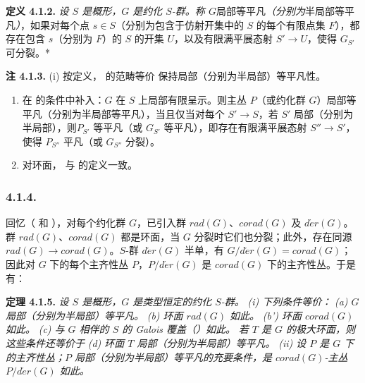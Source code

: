 \textbf{定义 4.1.2.} \emph{设 \(S\) 是概形，\(G\) 是约化 \(S\)-群。称 \(G\)}局部等平凡\emph{（分别为}半局部等平凡\emph{）}，如果对每个点 \(s \in S\)（分别为包含于仿射开集中的 \(S\) 的每个有限点集 \(F\)），都存在包含 \(s\)（分别为 \(F\)）的 \(S\) 的开集 \(U\)，以及有限满平展态射 \(S' \to U\)，使得 \(G_{S'}\) 可分裂。*

\textbf{注 4.1.3.} (i) 按定义， 的范畴等价  保持局部（分别为半局部）等平凡性。
\begin{enumerate}
\def\labelenumi{(\roman{enumi})}
\setcounter{enumi}{1}
\item 在  的条件中补入：\(G\) 在 \(S\) 上局部有限呈示。则主丛 \(P\)（或约化群 \(G\)）局部等平凡（分别为半局部等平凡），当且仅当对每个 \(S' \to S\)，若 \(S'\) 局部（分别为半局部），则\(P_{S'}\) 等平凡（或 \(G_{S'}\) 等平凡），即存在有限满平展态射 \(S'' \to S'\)，使得 \(P_{S''}\) 平凡（或 \(G_{S''}\) 分裂）。
\item 对环面， 与 的定义一致。
\end{enumerate}

\subsubsection*{4.1.4.}
回忆（ 和 ），对每个约化群 \(G\)，已引入群 \(rad(G)\)、\(corad(G)\) 及 \(d\acute{e}r(G)\)。群 \(rad(G)\)、\(corad(G)\) 都是环面，当 \(G\) 分裂时它们也分裂；此外，存在同源 \(rad(G) \to corad(G)\)。\(S\)-群 \(d\acute{e}r(G)\) 半单，有 \(G / d\acute{e}r(G) =corad(G)\)；因此对 \(G\) 下的每个主齐性丛 \(P\)，\(P / d\acute{e}r(G)\) 是 \(corad(G)\) 下的主齐性丛。于是有：

\textbf{定理 4.1.5.} \emph{设 \(S\) 是概形，\(G\) 是类型恒定的约化 \(S\)-群。}
\emph{(i) 下列条件等价：}
\emph{(a) \(G\) 局部（分别为半局部）等平凡。}
\emph{(b) 环面 \(rad(G)\) 如此。}
\emph{(b') 环面 \(corad(G)\) 如此。}
\emph{(c) 与 \(G\) 相伴的 \(S\) 的 Galois 覆盖（）如此。}
\emph{若 \(T\) 是 \(G\) 的极大环面，则这些条件还等价于}
\emph{(d) 环面 \(T\) 局部（分别为半局部）等平凡。}
\emph{(ii) 设 \(P\) 是 \(G\) 下的主齐性丛；\(P\) 局部（分别为半局部）等平凡的充要条件，是 \(corad(G)\)-主丛 \(P / d\acute{e}r(G)\) 如此。}

